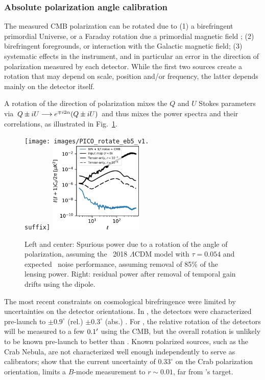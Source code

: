 \documentclass[PICOReport.tex]{subfiles}
\begin{document}
\subsubsection{Absolute polarization angle calibration}
\label{sec:angle}

The measured CMB polarization can be rotated due to (1) a birefringent primordial Universe, or a Faraday rotation
due a primordial magnetic field \citep{Pogosian+2018}; (2) birefringent
foregrounds, or interaction with the Galactic magnetic field;
(3) systematic effects in the instrument, and in particular an error in
the direction of polarization measured by each detector.  
While the first two sources create a rotation that may depend on scale,
position and/or frequency, the latter depends mainly on
the detector itself. 

A rotation {\prang} of the direction of polarization mixes the $Q$ and $U$ Stokes parameters via
$Q\pm iU \longrightarrow e^{\mp i 2 \alpha} (Q\pm iU)$
and thus mixes the power spectra and their correlations, as illustrated in Fig.~\ref{fig:rot_bb_tb_eb}.


\begin{figure}[htb]
\texttt{[image: images/PICO\_rotate\_eb5\_v1.\\suffix]} 
\includegraphics[width=0.4\textwidth]{images/calibration_spectrum_BB.pdf}
\caption{\captiontext
Left and center: Spurious power due to a rotation of the angle of polarization, assuming the \planck~2018 $\Lambda$CDM model \citep{Planck2018_VI} with $\tau=0.054$ and expected \pico\ noise performance, assuming removal of 85\% of the lensing power.  Right: residual power after removal of temporal gain drifts using the dipole.
\label{fig:rot_bb_tb_eb} }
\end{figure}

The most recent constraints on cosmological birefringence \citep{Planck2016_XLIX} were limited by uncertainties on the detector orientations.  In \planck, the detectors were characterized pre-launch to $\pm 0.9^\circ$ (rel.) $\pm 0.3^\circ$ (abs.) \citep{Rosset+2010}. For \pico, the relative rotation of the detectors will be measured to a few $0.1'$ using the CMB, but the overall rotation is unlikely to be known pre-launch to better than \planck.  Known polarized sources, such as the Crab Nebula, are not characterized well enough independently to serve as calibrators; \citet{Aumont+2018} show that the current uncertainty of $0.33^\circ$ on the Crab polarization orientation, limits a $B$-mode measurement to $r \sim 0.01$, far from \pico's target.
\end{document}

